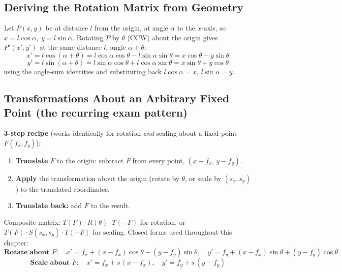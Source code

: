 \documentclass[12pt, a4paper]{article}
\newenvironment{answerbox}{\begin{mdframed}[style=answerframe]}{\end{mdframed}}
\begin{document}
\subsection{Deriving the Rotation Matrix from Geometry}
\begin{answerbox}
Let $P(x,y)$ be at distance $l$ from the origin, at angle $\alpha$ to the $x$-axis, so $x=l\cos\alpha,\ y=l\sin\alpha$. Rotating $P$ by $\theta$ (CCW) about the origin gives $P'(x',y')$ at the same distance $l$, angle $\alpha+\theta$:
$$x' = l\cos(\alpha+\theta) = l\cos\alpha\cos\theta - l\sin\alpha\sin\theta = x\cos\theta - y\sin\theta$$
$$y' = l\sin(\alpha+\theta) = l\sin\alpha\cos\theta + l\cos\alpha\sin\theta = x\sin\theta + y\cos\theta$$
using the angle-sum identities and substituting back $l\cos\alpha=x,\ l\sin\alpha=y$.
\end{answerbox}

\subsection{Transformations About an Arbitrary Fixed Point (the recurring exam pattern)}
\begin{answerbox}
\textbf{3-step recipe} (works identically for rotation \emph{and} scaling about a fixed point $F(f_x,f_y)$):
\begin{enumerate}[noitemsep]
  \item \textbf{Translate} $F$ to the origin: subtract $F$ from every point, $(x-f_x,\,y-f_y)$.
  \item \textbf{Apply} the transformation about the origin (rotate by $\theta$, or scale by $(s_x,s_y)$) to the translated coordinates.
  \item \textbf{Translate back:} add $F$ to the result.
\end{enumerate}
Composite matrix: $T(F)\cdot R(\theta)\cdot T(-F)$ for rotation, or $T(F)\cdot S(s_x,s_y)\cdot T(-F)$ for scaling.
Closed forms used throughout this chapter:
$$\textbf{Rotate about }F:\quad x'=f_x+(x-f_x)\cos\theta-(y-f_y)\sin\theta,\quad y'=f_y+(x-f_x)\sin\theta+(y-f_y)\cos\theta$$
$$\textbf{Scale about }F:\quad x'=f_x+s\,(x-f_x),\quad y'=f_y+s\,(y-f_y)$$
\end{answerbox}

\end{document}

